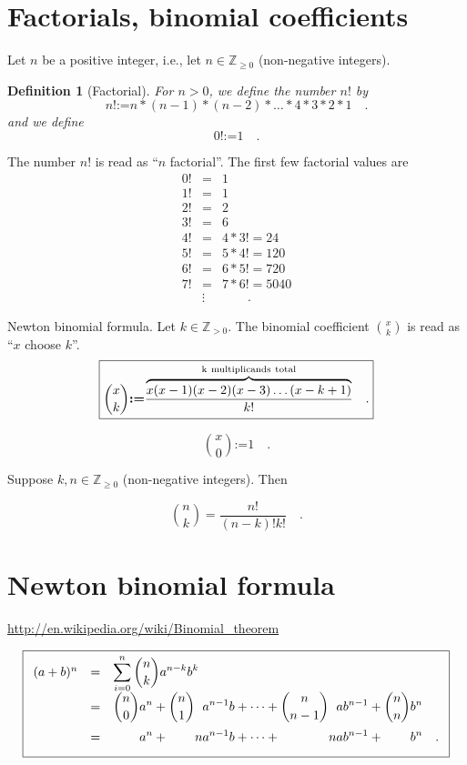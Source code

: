 \documentclass[12pt]{book}
\newcommand{\eqdef}{\textbf{:=}}
\newcommand{\importantFormula}[1]{\begin{equation} \boxed{#1} \end{equation}}
\newtheorem{definition}[theorem]{Definition}
\begin{document}
\section{Factorials, binomial coefficients}\label{secFactorial}
Let $n$ be a positive integer, i.e., let $n \in \mathbb Z_{\geq 0}$ (non-negative integers). 
\begin{definition}[Factorial]  
For $n>0$, we define the number $n!$ by
\[
n!\eqdef n*(n-1)*(n-2)*\dots *4*3*2*1 \quad  .
\] 
and we define 
\[
0!\eqdef 1\quad .
\]
\end{definition}
The number $n!$ is read as ``$n$ factorial''. The first few factorial values are 
\[\begin{array}{rcl}
0!&=&1\\
1!&=&1\\
2!&=&2\\
3!&=&6\\
4!&=&4*3!=24\\
5!&=&5*4!=120\\ 
6!&=&6*5!=720\\
7!&=&7*6!=5040  \\
&\vdots&\quad \quad .
\end{array}
\]

 Newton binomial formula.
 Let $k\in \mathbb Z_{>0}$. The binomial coefficient $\binom{x}{k}$ is read as ``$x$ choose $k$''.
\importantFormula{\label{eqBinomialCoeffDefinition}
\binom{x}{k}\eqdef \frac{ \overbrace{ x(x-1)(x-2)(x-3)\dots (x-k+1)}^{\mathrm{k~multiplicands~total}} } {k!} \quad .
}

\[\binom{x}{0}\eqdef 1 \quad .
\]

Suppose $k,n\in \mathbb Z_{\geq 0}$ (non-negative integers). Then

\[\binom{n}{k} = \frac{n!}{(n-k)! k!}\quad .
\]

\section{Newton binomial formula}\label{secNewtonBinomialReview}
\url{http://en.wikipedia.org/wiki/Binomial_theorem}



\importantFormula{\label{eqNewtonBinomialFormula}
\begin{array}{rcl}
(a+b)^{n} &=&\displaystyle \sum\limits_{i=0}^n \binom {n}{k} a^{n-k}b^{k} \\
&=&\displaystyle \binom{n}{0} a^n + \binom{n}{1}\phantom{n}a^{n-1}b +\dots+ \binom{n}{n-1} \phantom{n} ab^{n-1} + \binom{n}{n} b^n\\
&=&\displaystyle \phantom{\binom{n}{0}}a^n + \phantom{\binom{n}1} n a^{n-1}b+\dots + \phantom{\binom{n}{n-1}} na b^{n-1}+\phantom{\binom{n}{n}} b^n \quad .
\end{array}
}
\end{document}
